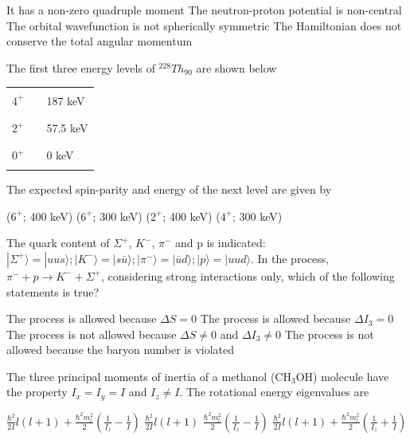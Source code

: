 \documentclass{exam}
\begin{document}
\begin{questions}
\begin{choices}
	\choice It has a non-zero quadruple moment \choice The neutron-proton potential is non-central
	\choice The orbital wavefunction is not spherically symmetric \choice The Hamiltonian does not conserve the total angular momentum
\end{choices}

\question The first three energy levels of ${}^{228}Th_{90}$ are shown below
	\begin{center}
	\begin{tabular}{r c l}
		$4^+$ & \rule{3cm}{0.4pt} & 187 keV \\
		$2^+$ & \rule{3cm}{0.4pt} & 57.5 keV \\
		$0^+$ & \rule{3cm}{0.4pt} & 0 keV \\
	\end{tabular}
	\end{center}
The expected spin-parity and energy of the next level are given by\hfill{}

\begin{oneparchoices}
	\choice ($6^+$; 400 keV) \choice ($6^+$; 300 keV) \choice ($2^+$; 400 keV) \choice ($4^+$; 300 keV)
\end{oneparchoices}

\question The quark content of $\Sigma^{+}$, $K^{-}$, $\pi^{-}$ and p is indicated: $|\Sigma^{+}\rangle=|uus\rangle; |K^{-}\rangle=|s\bar{u}\rangle; |\pi^{-}\rangle=|\bar{u}d\rangle; |p\rangle=|uud\rangle$. In the process, $\pi^{-} + p \rightarrow K^{-} + \Sigma^{+}$, considering strong interactions only, which of the following statements is true?\hfill{}

\begin{choices}
	\choice The process is allowed because $\Delta S = 0$
	\choice The process is allowed because $\Delta I_3 = 0$
	\choice The process is not allowed because $\Delta S \neq 0$ and $\Delta I_3 \neq 0$
	\choice The process is not allowed because the baryon number is violated
\end{choices}

\question The three principal moments of inertia of a methanol (CH$_3$OH) molecule have the property $I_x = I_y = I$ and $I_z \neq I$. The rotational energy eigenvalues are\hfill{}

\begin{oneparchoices}
	\choice $\frac{\hbar^{2}}{2I}l(l+1)+\frac{\hbar^{2}m_{l}^{2}}{2}(\frac{1}{I_{z}}-\frac{1}{I})$
	\choice $\frac{\hbar^{2}}{2I}l(l+1)$
	\choice $\frac{\hbar^{2}m_{l}^{2}}{2}(\frac{1}{I_{z}}-\frac{1}{I})$
	\choice $\frac{\hbar^{2}}{2I}l(l+1)+\frac{\hbar^{2}m_{l}^{2}}{2}(\frac{1}{I_{z}}+\frac{1}{I})$
\end{oneparchoices}


\end{questions}
\end{document}
